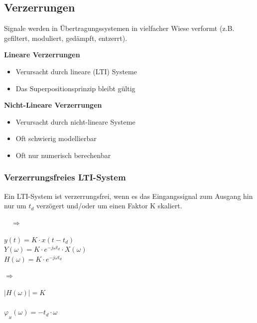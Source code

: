 \subsection{Verzerrungen }
	Signale werden in \"Ubertragungssystemen in vielfacher Wiese verformt (z.B. gefiltert, moduliert, gedämpft, entzerrt).
	\begin{multicols}{2}
		\textbf{Lineare Verzerrungen}
			\begin{itemize}
				\item Verursacht durch lineare (LTI) Systeme
				\item Das Superpositionsprinzip bleibt gültig
			\end{itemize}
			\columnbreak
			
		\textbf{Nicht-Lineare Verzerrungen}
			\begin{itemize}
				\item Verursacht durch nicht-lineare Systeme
				\item Oft schwierig modellierbar
				\item Oft nur numerisch berechenbar
			\end{itemize}
	\end{multicols}
	
	\subsubsection{Verzerrungsfreies LTI-System}
		\begin{minipage}[c]{6cm}
			Ein LTI-System ist verzerrungsfrei, wenn es das Eingangssignal zum Ausgang hin nur um $t_d$ verz\"ogert und/oder um einen Faktor K skaliert. 
		\end{minipage}
		$\quad \Longrightarrow \quad$
		\begin{minipage}[c]{4cm}
			$y(t) = K \cdot x(t-t_d)$  
			\\[0.2cm]
			$Y(\omega) = K \cdot e^{-j\omega t_d} \cdot X(\omega)$\\[0.2cm]
			$\boxed{H(\omega) = K \cdot e^{-j\omega t_d}}$
		\end{minipage}
		$\Longrightarrow \quad$
		\begin{minipage}[c]{5cm}
			$|H(\omega)| = K$\\ \\
			$\varphi_{_H}(\omega) = -t_d \cdot \omega$
		\end{minipage}
	
